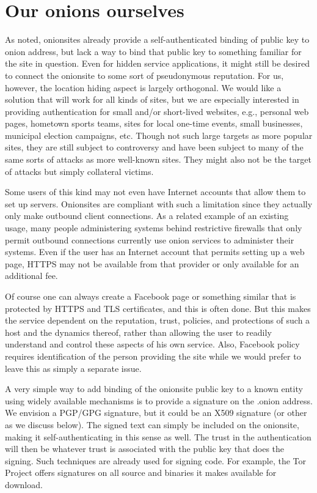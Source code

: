 \documentclass[10pt, conference, compsocconf]{styles/IEEEtran}
\begin{document}
\section{Our onions ourselves}

As noted, onionsites already provide a self-authenticated binding of
public key to onion address, but lack a way to bind that public key to
something familiar for the site in question.  Even for hidden
service applications, it might still be desired to connect the
onionsite to some sort of pseudonymous reputation.  For us, however,
the location hiding aspect is largely orthogonal.  We would like a solution
that will work for all kinds of sites, but we are especially
interested in providing authentication for small and/or short-lived
websites, e.g., personal web pages, hometown sports teams, sites for
local one-time events, small businesses, municipal election campaigns,
etc.  Though not such large targets as more popular sites, they are
still subject to controversy and have been subject to many of the same
sorts of attacks as more well-known sites.  They might also not be
the target of attacks but simply collateral victims. 

Some users of this kind may
not even have Internet accounts that allow them to set up
servers. Onionsites are compliant with such a limitation since they
actually only make outbound client connections. As a related
example of an existing usage, many people administering systems
behind restrictive firewalls that only permit outbound connections
currently use onion services to administer their systems.  Even if the
user has an Internet account that permits setting up a web page, HTTPS
may not be available from that provider or only available for an
additional fee.

Of course one can always create a Facebook page or something similar
that is protected by HTTPS and TLS certificates,
and this is often done.  But this makes the service dependent on the
reputation, trust, policies, and protections of such a host and the
dynamics thereof, rather than allowing the user to readily understand
and control these aspects of his own service. Also, Facebook
policy requires identification of the person providing the site
while we would prefer to leave this as simply a separate issue.

A very simple way to add binding of the onionsite public key to
a known entity using widely available mechanisms is to provide a
signature on the .onion address. We envision a PGP/GPG signature, but
it could be an X509 signature (or other as we discuss below). 
The signed text can simply be
included on the onionsite, making it self-authenticating in this sense
as well. The trust in the authentication will then be whatever trust
is associated with the public key that does the signing. Such
techniques are already used for signing code. For example,
the Tor Project offers signatures on all source and binaries
it makes available for download. 
\end{document}
